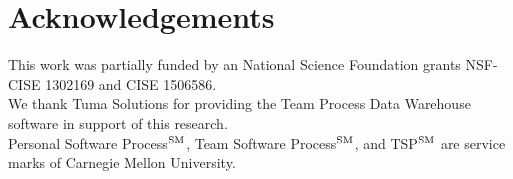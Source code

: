 \documentclass{sig-alternate}
\newcommand{\fig}[1]{Figure~\ref{fig:#1}}
\begin{document}
 





\section*{Acknowledgements}
This work was partially funded by an National Science
Foundation grants NSF-CISE 1302169 and CISE 1506586.
\\
We thank Tuma Solutions for providing the Team Process Data Warehouse software in support of this research.  \\
Personal Software Process$\textsuperscript{SM}$, Team Software Process$\textsuperscript{SM}$, and TSP$\textsuperscript{SM}$ are service marks of Carnegie Mellon University.

 
\vspace*{0.5mm}
\scriptsize

 
\end{document}
